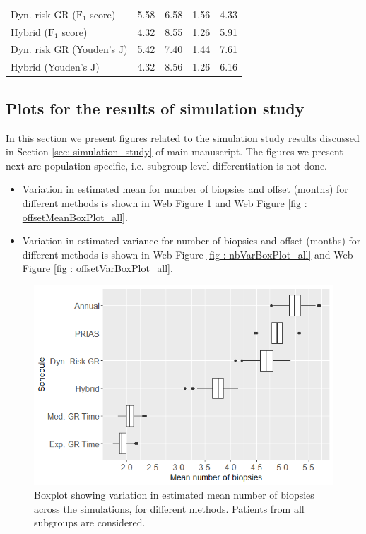 \begin{table}[!htb]
\begin{tabular}{lrrrr}
Dyn. risk GR ($\mbox{F}_1$ score)       & 5.58            & 6.58                & 1.56          & 4.33              \\
Hybrid ($\mbox{F}_1$ score)       & 4.32            & 8.55                & 1.26          & 5.91              \\
Dyn. risk GR (Youden's $\mbox{J}$)      & 5.42            & 7.40                & 1.44          & 7.61  \\        
Hybrid (Youden's $\mbox{J}$)   & 4.32            & 8.56                & 1.26          & 6.16              \\
\hline     
\end{tabular}
\end{table}

\subsection{Plots for the results of simulation study}
In this section we present figures related to the simulation study results discussed in Section \ref{sec: simulation_study} of main manuscript. The figures we present next are population specific, i.e. subgroup level differentiation is not done.

\begin{itemize}
  \item Variation in estimated mean for number of biopsies and offset (months) for different methods is shown in Web Figure \ref{fig : nbMeanBoxPlot_all} and Web Figure \ref{fig : offsetMeanBoxPlot_all}.
  \item Variation in estimated variance for number of biopsies and offset (months) for different methods is shown in Web Figure \ref{fig : nbVarBoxPlot_all} and Web Figure \ref{fig : offsetVarBoxPlot_all}.
\end{itemize}

\begin{figure}[!htb]
\centerline{\includegraphics[width=\columnwidth]{images/sim_study/nbMeanBoxPlot_all.png}}
\caption{Boxplot showing variation in estimated mean number of biopsies across the simulations, for different methods. Patients from all subgroups are considered.}
\label{fig : nbMeanBoxPlot_all}
\end{figure}

